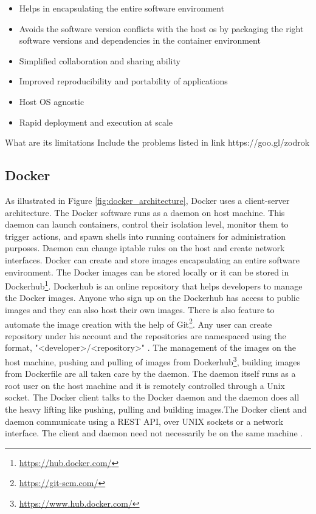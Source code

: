 \begin{itemize}
  \item Helps in encapsulating the entire software environment
  \item Avoids the software version conflicts with the host os by packaging the right software versions and dependencies in the container environment
  \item Simplified collaboration and sharing ability
  \item Improved reproducibility and portability of applications
  \item Host OS agnostic
  \item Rapid deployment and execution at scale
\end{itemize}


What are its limitations
Include the problems listed in link https://goo.gl/zodrok

\subsection{Docker}
As illustrated in Figure \ref{fig:docker_architecture}, Docker uses a client-server architecture. The Docker software runs as a daemon on host machine. This daemon can launch containers, control their isolation level, monitor them to trigger actions, and spawn shells into running containers for administration purposes. Daemon can change iptable rules on the host and create network interfaces. Docker can create and store images encapsulating an entire software environment. The Docker images can be stored locally or it can be stored in Dockerhub\footnote{\url{https://hub.docker.com/}}. Dockerhub is an online repository that helps developers to manage the Docker images. Anyone who sign up on the Dockerhub has access to public images and they can also host their own images. There is also feature to automate the image creation with the help of Git\footnote{\url{https://git-scm.com/}}. Any user can create repository under his account and the repositories are namespaced using the format, "\textless developer\textgreater/\textless repository\textgreater" \cite{7742298}. The management of the images on the host machine, pushing and pulling of images from Dockerhub\footnote{\url{https://www.hub.docker.com/}}, building images from Dockerfile are all taken care by the daemon. The daemon itself runs as a root user on the host machine and it is remotely controlled through a Unix socket. The Docker client talks to the Docker daemon and the daemon does all the heavy lifting like pushing, pulling and building images.The Docker client and daemon communicate using a REST API, over UNIX sockets or a network interface. The client and daemon need not necessarily be on the same machine \cite{docker-documentation}.

